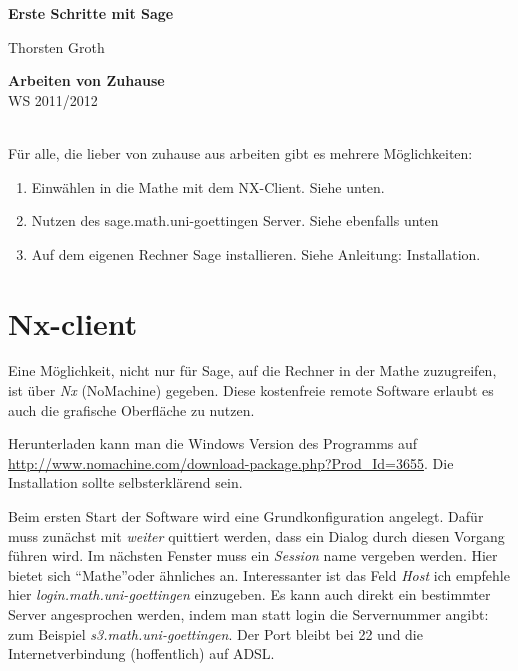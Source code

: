 \documentclass[a4paper,10pt,DIV15]{scrartcl}
\begin{document}

\begin{center}
\textbf{\LARGE Erste Schritte mit Sage}\\
\end{center}
\begin{minipage}{6cm}
Thorsten Groth
\end{minipage}\hfill
\begin{minipage}{2.5cm}
\begin{flushright}
\textbf{Arbeiten von Zuhause}\\
WS 2011/2012
\end{flushright}
\end{minipage}\\[1cm]


Für alle, die lieber von zuhause aus arbeiten gibt es mehrere Möglichkeiten:
\begin{enumerate}
 \item Einwählen in die Mathe mit dem NX-Client. Siehe unten.
 \item Nutzen des sage.math.uni-goettingen Server. Siehe ebenfalls unten
 \item Auf dem eigenen Rechner Sage installieren. Siehe Anleitung: Installation.
\end{enumerate}


\section{Nx-client}
Eine Möglichkeit, nicht nur für Sage, auf die Rechner in der Mathe zuzugreifen, ist über \emph{Nx} (NoMachine) gegeben. Diese kostenfreie 
remote Software erlaubt es auch die grafische Oberfläche zu nutzen. 

Herunterladen kann man die Windows Version des Programms auf \url{http://www.nomachine.com/download-package.php?Prod_Id=3655}. Die Installation
sollte selbsterklärend sein. 

Beim ersten Start der Software wird eine Grundkonfiguration angelegt. Dafür muss zunächst mit \emph{weiter} quittiert werden, dass ein Dialog
durch diesen Vorgang führen wird. 
Im nächsten Fenster muss ein \emph{Session} name vergeben werden. Hier bietet sich \textquotedblleft Mathe\textquotedblright oder ähnliches an.
Interessanter ist das Feld \emph{Host} ich empfehle hier \emph{login.math.uni-goettingen} einzugeben. Es kann auch direkt ein bestimmter Server
angesprochen werden, indem man statt login die Servernummer angibt: zum Beispiel \emph{s3.math.uni-goettingen}.
Der Port bleibt bei 22 und die Internetverbindung (hoffentlich) auf ADSL. 
\end{document}
